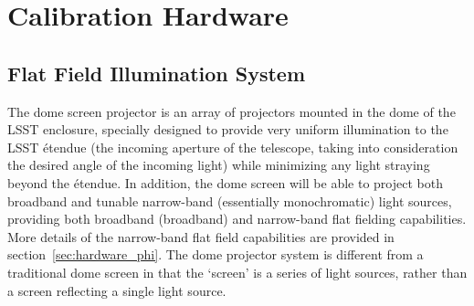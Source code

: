 \documentclass[12pt,preprint]{aastex}
\begin{document}
\section{Calibration Hardware}
\label{sec:calib_details}

% 

\subsection{Flat Field Illumination System}
The dome screen projector is an array of projectors mounted in the
dome of the LSST enclosure, specially designed to provide very uniform
illumination to the LSST \'{e}tendue (the incoming aperture of the
telescope, taking into consideration the desired angle of the incoming
light) while minimizing any light straying beyond the \'{e}tendue. In
addition, the dome screen will be able to project both broadband and
tunable narrow-band (essentially monochromatic) light sources,
providing both broadband (broadband) and narrow-band flat fielding
capabilities.  More details of the narrow-band flat field capabilities
are provided in section~\ref{sec:hardware_phi}. The dome projector
system is different from a traditional dome screen in that the
`screen' is a series of light sources, rather than a screen reflecting
a single light source.
\end{document}
